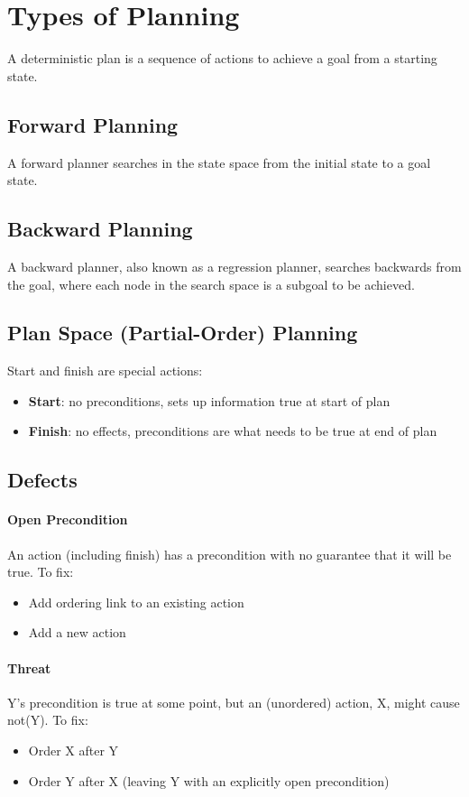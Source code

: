 \section{Types of Planning}

  A deterministic plan is a sequence of actions to achieve a
  goal from a starting state.

  \subsection{Forward Planning}

    A forward planner searches in the state space from the
    initial state to a goal state.

  \subsection{Backward Planning}

    A backward planner, also known as a regression planner,
    searches backwards from the goal, where each node in
    the search space is a subgoal to be achieved.

  \subsection{Plan Space (Partial-Order) Planning}

    Start and finish are special actions:
    \begin{itemize}
      \item \textbf{Start}: no preconditions, sets up information true
      at start of plan
      \item \textbf{Finish}: no effects, preconditions are what
      needs to be true at end of plan
    \end{itemize}

    \subsection{Defects}

      \paragraph{Open Precondition}
      An action (including finish) has a precondition with no
      guarantee that it will be true. To fix:
      \begin{itemize}
        \item Add ordering link to an existing action
        \item Add a new action
      \end{itemize}

      \paragraph{Threat}
      Y's precondition is true at some point, but an (unordered) action, X,
      might cause not(Y). To fix:
      \begin{itemize}
        \item Order X after Y
        \item Order Y after X (leaving Y with an explicitly open precondition)
      \end{itemize}
